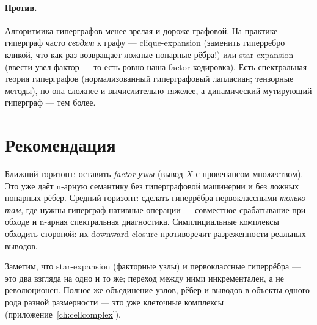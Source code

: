 \paragraph{Против.} Алгоритмика гиперграфов менее зрелая и дороже графовой.
На практике гиперграф часто \emph{сводят} к графу --- clique-expansion
(заменить гиперребро кликой, что как раз возвращает ложные попарные рёбра!)
или star-expansion (ввести узел-фактор --- то есть ровно наша
factor-кодировка). Есть спектральная теория гиперграфов (нормализованный
гиперграфовый лапласиан; тензорные методы), но она сложнее и вычислительно
тяжелее, а динамический мутирующий гиперграф --- тем более.

\section{Рекомендация}

\begin{principle}
Ближний горизонт: оставить \emph{factor-узлы} (вывод $X$ с
провенансом-множеством). Это уже даёт n-арную семантику без гиперграфовой
машинерии и без ложных попарных рёбер. Средний горизонт: сделать
гиперрёбра первоклассными \emph{только там}, где нужны гиперграф-нативные
операции --- совместное срабатывание при обходе и n-арная спектральная
диагностика. Симплициальные комплексы обходить стороной: их downward closure
противоречит разреженности реальных выводов.
\end{principle}

Заметим, что star-expansion (факторные узлы) и первоклассные гиперрёбра ---
это два взгляда на одно и то же; переход между ними инкрементален, а не
революционен. Полное же объединение узлов, рёбер и выводов в объекты одного
рода разной размерности --- это уже клеточные комплексы
(приложение~\ref{ch:cellcomplex}).
